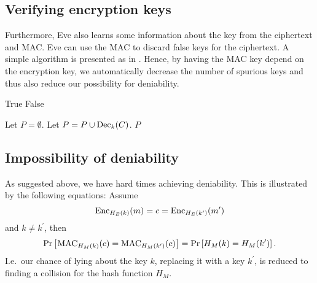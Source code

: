 \subsection{Verifying encryption keys}

Furthermore, Eve also learns some information about the key from the ciphertext 
and \ac{MAC}.
Eve can use the \ac{MAC} to discard false keys for the ciphertext.
A simple algorithm is presented as  in 
.
Hence, by having the \ac{MAC} key depend on the encryption key, we 
automatically decrease the number of spurious keys and thus also reduce our 
possibility for deniability.

\begin{algorithm}
  \caption{%
    Algorithm for finding possible plaintexts and discarding false keys.
  }
  \label{alg:falsekeys}
  \hrulefill
  \begin{algorithmic}
        \State \Return True
      \EndIf
      \State \Return False
    \EndFunction

    \Statex
      \State Let $P = \emptyset$.
          \State Let $P = P\cup \operatorname{\mathrm{Dec}}_k( C )$.
        \EndIf
      \EndFor
      \State \Return $P$
    \EndFunction
  \end{algorithmic}
  \hrulefill
\end{algorithm}

\subsection{Impossibility of deniability}

As suggested above, we have hard times achieving deniability.
This is illustrated by the following equations:
Assume
\begin{equation*}
  \operatorname{\mathrm{Enc}}_{H_E(k)}( m ) = c = \operatorname{\mathrm{Enc}}_{H_E(k^\prime)}( m^\prime )
\end{equation*}
and \(k\neq k^\prime\), then
\begin{equation*}
  \Pr\left[
    \operatorname{\mathrm{MAC}}_{H_M(k)}( c ) = \operatorname{\mathrm{MAC}}_{H_M(k^\prime)}( c )
  \right] =
  \Pr\left[ H_M(k) = H_M(k^\prime) \right].
\end{equation*}
I.e.~our chance of lying about the key \(k\), replacing it with a key 
\(k^\prime\), is reduced to finding a collision for the hash function \(H_M\).

